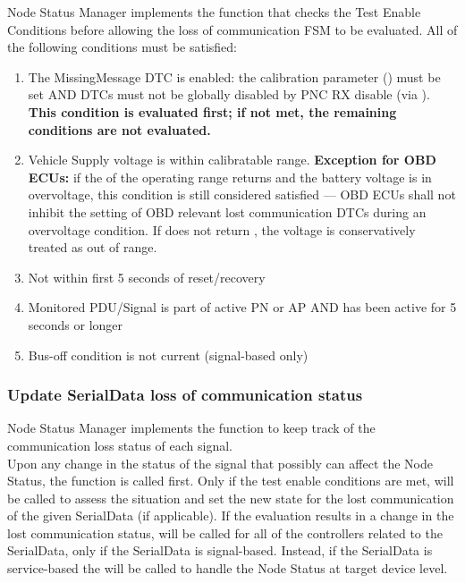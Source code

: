 Node Status Manager implements the function  that checks the Test Enable Conditions before  allowing the loss of communication FSM to be evaluated. All of the following conditions must be satisfied:
\begin{enumerate}
    \item The MissingMessage DTC is enabled: the calibration parameter () must be set AND DTCs must not be globally disabled by PNC RX disable (via ). \textbf{This condition is evaluated first; if not met, the remaining conditions are not evaluated.}
    \item Vehicle Supply voltage is within calibratable range. \textbf{Exception for OBD ECUs:} if the  of the operating range returns  and the battery voltage is in overvoltage, this condition is still considered satisfied --- OBD ECUs shall not inhibit the setting of OBD relevant lost communication DTCs during an overvoltage condition. If  does not return , the voltage is conservatively treated as out of range.
    \item Not within first 5 seconds of reset/recovery
    \item Monitored PDU/Signal is part of active PN or AP AND has been active for 5 seconds or longer
    \item Bus-off condition is not current (signal-based only)
\end{enumerate}

{}

\subsubsection{Update SerialData loss of communication status}

Node Status Manager implements the function  to keep track of the communication loss status of each signal.
\\

Upon any change in the status of the signal that possibly can affect the Node Status, the  function is called first. Only if the test enable conditions are met,  will be called to assess the situation and
set the new state for the lost communication of the given SerialData (if applicable). If the evaluation results in a change in the lost communication status,
 will be called for all of the controllers related to the SerialData, only if the SerialData is signal-based.
Instead, if the SerialData is service-based the  will be called to handle the Node Status at target device level.


